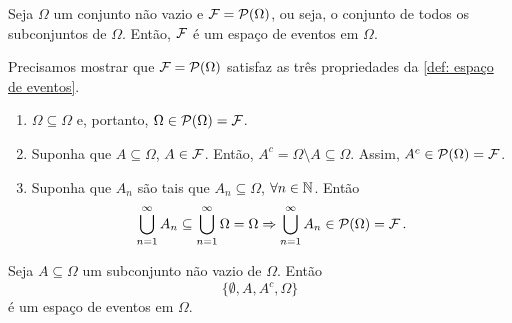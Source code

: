\begin{exercise}
Seja $\Omega$ um conjunto não vazio e $\mathcal F=\mathcal{P}(\Omega)$, ou seja, o conjunto de todos os subconjuntos de $\Omega$. Então, $\mathcal F$ é um espaço de eventos em $\Omega$. 
\end{exercise}

\begin{solution}
Precisamos mostrar que $\mathcal F=\mathcal{P}(\Omega)$ satisfaz as três propriedades da \ref{def: espaço de eventos}.
\begin{enumerate}
[$ (i) $]
\item $\Omega \subseteq \Omega$ e, portanto, $\Omega\in\mathcal{P}(\Omega) = \mathcal F$.
\item Suponha que $A \subseteq \Omega$, $A \in \mathcal F$. Então, $A^c = \Omega \setminus A \subseteq \Omega$. Assim, $A^c \in \mathcal{P}(\Omega) =\mathcal F$.
\item Suponha que $A_n$ são tais que $A_n \subseteq \Omega$, $\forall n\in\mathbb{N}$. Então
\begin{equation}
\bigcup_{n=1}^{\infty}A_n \subseteq \bigcup_{n=1}^{\infty} \Omega = \Omega
\Rightarrow \bigcup_{n=1}^{\infty}A_n \in \mathcal{P}(\Omega) =\mathcal F \,.
\end{equation}
\end{enumerate}
\end{solution}

\begin{exercise}

Seja $A \subseteq \Omega$ um subconjunto não vazio de $\Omega$. Então
\begin{equation}
\{ \emptyset, A, A^c, \Omega\}
\end{equation}
é um espaço de eventos em $\Omega$.
\end{exercise}

